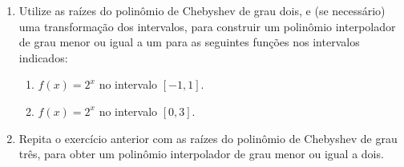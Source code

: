 \documentclass[12pt,a4paper]{article}
\begin{document}
\begin{enumerate}
\item Utilize as raízes do polinômio de Chebyshev de grau dois, e (se necessário) uma transformação dos intervalos, para construir um polinômio interpolador de grau menor ou igual a um para as seguintes funções nos intervalos indicados:
\begin{multicols}{2}
\begin{enumerate}
   \item $f(x) = 2^x$ no intervalo $[-1, 1]$.
   \item $f(x) = 2^x$ no intervalo $[0, 3]$.
\end{enumerate}
\end{multicols}

\item Repita o exercício anterior com as raízes do polinômio de Chebyshev de grau três, para obter um polinômio interpolador de grau menor ou igual a dois.
\end{enumerate}


\newpage
\end{document}
